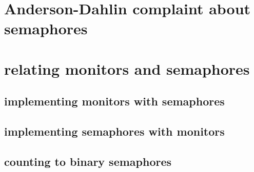 
\section{Anderson-Dahlin complaint about semaphores}


\section{relating monitors and semaphores}

\subsection{implementing monitors with semaphores}

 

\subsection{implementing semaphores with monitors}




\subsection{counting to binary semaphores}

